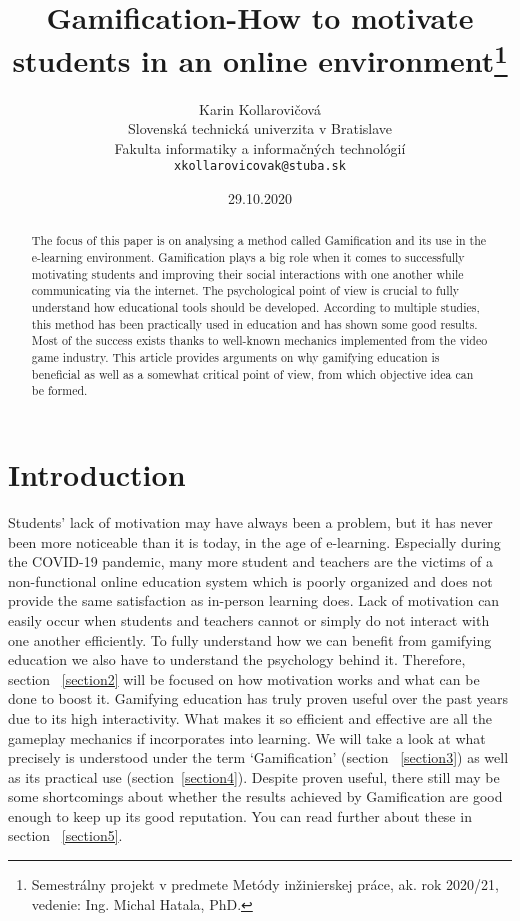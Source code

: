 \documentclass[10pt,twoside,english,a4paper]{article}
\title{Gamification-How to motivate students in an online environment\thanks{Semestrálny projekt v predmete Metódy inžinierskej práce, ak. rok 2020/21, vedenie: Ing. Michal Hatala, PhD.}}
\author{Karin Kollarovičová\\[2pt]
	{\small Slovenská technická univerzita v Bratislave}\\
	{\small Fakulta informatiky a informačných technológií}\\
	{\small \texttt{xkollarovicovak@stuba.sk}}
	}
\date{\small 29.10.2020}
\begin{document}
\maketitle

\begin{abstract}
	The focus of this paper is on analysing a method called Gamification and its use in the e-learning environment. 
	Gamification plays a big role when it comes to successfully motivating students and improving their social interactions with one another while communicating via the internet. 
	The psychological point of view is crucial to fully understand how educational tools should be developed. 
	According to multiple studies, this method has been practically used in education and has shown some good results. 
	Most of the success exists thanks to well-known mechanics implemented from the video game industry. 
	This article provides arguments on why gamifying education is beneficial as well as a somewhat critical point of view, from which objective idea can be formed. 
\end{abstract}



\section{Introduction} \label{introduction}
	Students’ lack of motivation may have always been a problem, but it has never been more noticeable than it is today, in the age of e-learning. 
	Especially during the COVID-19 pandemic, many more student and teachers are the victims of a non-functional online education system which is poorly organized and does not provide the same satisfaction as in-person learning does.
	Lack of motivation can easily occur when students and teachers cannot or simply do not interact with one another efficiently. To fully understand how we can benefit from gamifying education we also have to understand the psychology behind it. 
	Therefore, section ~\ref{section2} will be focused on how motivation works and what can be done to boost it.
	Gamifying education has truly proven useful over the past years due to its high interactivity. What makes it so efficient and effective are all the gameplay mechanics if incorporates into learning.
	We will take a look at what precisely is understood under the term ‘Gamification’ (section ~\ref{section3}) as well as its practical use (section~\ref{section4}).
	Despite proven useful, there still may be some shortcomings about whether the results achieved by Gamification are good enough to keep up its good reputation. You can read further about these in section ~\ref{section5}.
\end{document}
